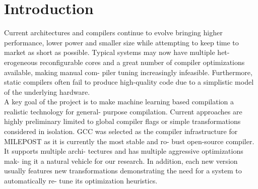 
\section{Introduction}

Current architectures and compilers continue to evolve
bringing higher performance, lower power and smaller
size while attempting to keep time to market as short as
possible.\cite{Plug} Typical systems may now have multiple het-
erogeneous reconfigurable cores and a great number of
compiler optimizations available, making manual com-
piler tuning increasingly infeasible. Furthermore, static
compilers often fail to produce high-quality code due to
a simplistic model of the underlying hardware.\\

A key goal of the project is to make machine learning
based compilation a realistic technology for general-
purpose compilation. Current approaches 
are highly preliminary limited to global compiler
flags or simple transformations considered in isolation.
GCC was selected as the compiler infrastructure for
MILEPOST as it is currently the most stable and ro-
bust open-source compiler.\cite{Qlogic} It supports multiple archi-
tectures and has multiple aggressive optimizations mak-
ing it a natural vehicle for our research. In addition,
each new version usually features new transformations
demonstrating the need for a system to automatically re-
tune its optimization heuristics.



